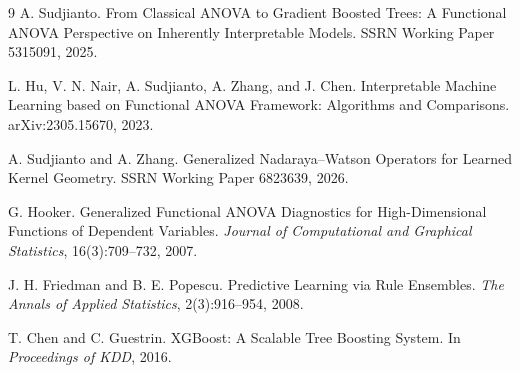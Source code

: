 \documentclass[11pt]{article}
\begin{document}
\begin{thebibliography}{9}
A. Sudjianto.
\newblock From Classical ANOVA to Gradient Boosted Trees: A Functional ANOVA
Perspective on Inherently Interpretable Models.
\newblock SSRN Working Paper 5315091, 2025.

L. Hu, V. N. Nair, A. Sudjianto, A. Zhang, and J. Chen.
\newblock Interpretable Machine Learning based on Functional ANOVA Framework:
Algorithms and Comparisons.
\newblock arXiv:2305.15670, 2023.

A. Sudjianto and A. Zhang.
\newblock Generalized Nadaraya--Watson Operators for Learned Kernel Geometry.
\newblock SSRN Working Paper 6823639, 2026.

G. Hooker.
\newblock Generalized Functional ANOVA Diagnostics for High-Dimensional Functions
of Dependent Variables.
\newblock \emph{Journal of Computational and Graphical Statistics}, 16(3):709--732, 2007.

J. H. Friedman and B. E. Popescu.
\newblock Predictive Learning via Rule Ensembles.
\newblock \emph{The Annals of Applied Statistics}, 2(3):916--954, 2008.

T. Chen and C. Guestrin.
\newblock XGBoost: A Scalable Tree Boosting System.
\newblock In \emph{Proceedings of KDD}, 2016.
\end{thebibliography}
\end{document}
